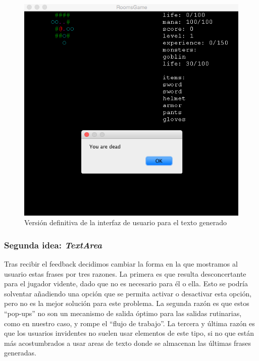 \begin{figure}
    \includegraphics[width=\textwidth,height=\textheight,keepaspectratio]{./img/firstiterationui.png}
  \caption{Versión definitiva de la interfaz de usuario para el texto generado}
  \label{fig:firstiterationui}
\end{figure}

\subsubsection{Segunda idea: \textit{TextArea}}

Tras recibir el feedback decidimos cambiar la forma en la que mostramos al usuario estas frases por tres razones. La primera es que resulta desconcertante para el jugador vidente, dado que no es necesario para él o ella. Esto se podría solventar añadiendo una opción que se permita activar o desactivar esta opción, pero no es la mejor solución para este problema.
La segunda razón es que estos ``pop-ups'' no son un mecanismo de salida óptimo para las salidas rutinarias, como en nuestro caso, y rompe el ``flujo de trabajo''.
La tercera y última razón es que los usuarios invidentes no suelen usar elementos de este tipo, si no que están más acostumbrados a usar areas de texto donde se almacenan las últimas frases generadas.

